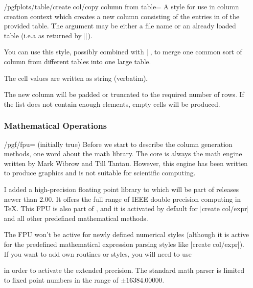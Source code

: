 \documentclass[a4paper]{ltxdoc}
\begin{document}
\begin{stylekey}{/pgfplots/table/create col/copy column from table=}
    A style for use in column creation context which creates a new column
    consisting of the entries in  of the provided table. The
    argument may be either a file name or an already loaded table (i.e.\@ a
     as returned by |\pgfplotstableread|).

    You can use this style, possibly combined with |\pgfplotstablenew|, to
    merge one common sort of column from different tables into one large table.

    The cell values are written as string (verbatim).

    \noindent The new column will be padded or truncated to the required number
    of rows. If the list does not contain enough elements, empty cells will be
    produced.
\end{stylekey}


\subsubsection{Mathematical Operations}

\begin{key}{/pgf/fpu= (initially true)}
    Before we start to describe the column generation methods, one word about
    the math library. The core is always the \PGF{} math engine written by Mark
    Wibrow and Till Tantau. However, this engine has been written to produce
    graphics and is not suitable for scientific computing.

    I added a high-precision floating point library to \PGF{} which will be
    part of releases newer than \PGF{} $2.00$. It offers the full range of IEEE
    double precision computing in \TeX. This FPU is also part of
    \PGFPlotstable{}, and it is activated by default for |create col/expr| and
    all other predefined mathematical methods.

    The FPU won't be active for newly defined numerical styles (although it is
    active for the predefined mathematical expression parsing styles like
    |create col/expr|). If you want to add own routines or styles, you will
    need to use
\begin{codeexample}
\end{codeexample}
    \noindent in order to activate the extended precision. The standard math
    parser is limited to fixed point numbers in the range of $\pm 16384.00000$.
\end{key}
\end{document}
